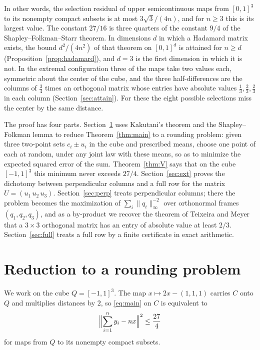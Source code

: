 \documentclass[11pt]{amsart}
\theoremstyle{remark}
\numberwithin{equation}{section}
\begin{document}
In other words, the selection residual of upper semicontinuous maps from $[0,1]^3$ to its nonempty compact subsets is at most $3\sqrt3/(4n)$, and for $n\ge3$ this is its largest value. The constant $27/16$ is three quarters of the constant $9/4$ of the Shapley--Folkman--Starr theorem. In dimensions $d$ in which a Hadamard matrix exists, the bound $d^2/(4n^2)$ of that theorem on $[0,1]^d$ is attained for $n\ge d$ (Proposition~\ref{prop:hadamard}), and $d=3$ is the first dimension in which it is not. In the extremal configuration three of the maps take two values each, symmetric about the center of the cube, and the three half-differences are the columns of $\frac34$ times an orthogonal matrix whose entries have absolute values $\frac13,\frac23,\frac23$ in each column (Section~\ref{sec:attain}). For these the eight possible selections miss the center by the same distance.

The proof has four parts. Section~\ref{sec:reduction} uses Kakutani's theorem and the Shapley--Folkman lemma to reduce Theorem~\ref{thm:main} to a rounding problem: given three two-point sets $c_i\pm u_i$ in the cube and prescribed means, choose one point of each at random, under any joint law with these means, so as to minimize the expected squared error of the sum. Theorem~\ref{thm:V} says that on the cube $[-1,1]^3$ this minimum never exceeds $27/4$. Section~\ref{sec:ext} proves the dichotomy between perpendicular columns and a full row for the matrix $U=(u_1\,u_2\,u_3)$. Section~\ref{sec:perp} treats perpendicular columns; there the problem becomes the maximization of $\sum_i\|q_i\|_\infty^{-2}$ over orthonormal frames $(q_1,q_2,q_3)$, and as a by-product we recover the theorem of Teixeira and Meyer~\cite{TeixeiraMeyer} that a $3\times3$ orthogonal matrix has an entry of absolute value at least $2/3$. Section~\ref{sec:full} treats a full row by a finite certificate in exact arithmetic.

\section{Reduction to a rounding problem}\label{sec:reduction}

We work on the cube $Q=[-1,1]^3$. The map $x\mapsto2x-(1,1,1)$ carries $C$ onto $Q$ and multiplies distances by $2$, so \eqref{eq:main} on $C$ is equivalent to
\begin{equation}\label{eq:mainQ}
\Bigl\|\sum_{i=1}^n y_i-nx\Bigr\|^2\le\frac{27}{4}
\end{equation}
for maps from $Q$ to its nonempty compact subsets.
\end{document}
